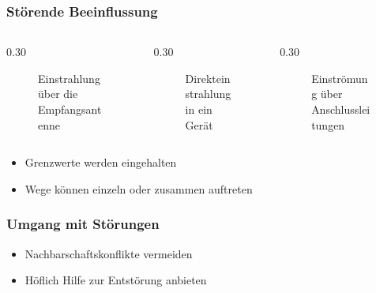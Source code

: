 \begin{frame}
    \frametitle{Störende Beeinflussung}
    \begin{columns}
        \begin{column}{0.30\textwidth}
            \begin{figure}
                \caption{\scriptsize Einstrahlung über die Empfangsantenne}
                \label{stoerungen_vermeiden_einstrahlung}
            \end{figure}
        \end{column}
        \begin{column}{0.30\textwidth}
            \begin{figure}
                \caption{\scriptsize Direkteinstrahlung in ein Gerät}
                \label{stoerungen_vermeiden_direkteinstrahlung}
            \end{figure}
        \end{column}
        \begin{column}{0.30\textwidth}

            \begin{figure}
                \caption{\scriptsize Einströmung über Anschlussleitungen}
                \label{stoerungen_vermeiden_einstroemung}
            \end{figure}
        \end{column}
    \end{columns}
    \begin{itemize}
        \item Grenzwerte werden eingehalten
        \item Wege können einzeln oder zusammen auftreten
    \end{itemize}
\end{frame}

\begin{frame}
    \frametitle{Umgang mit Störungen}
    \begin{itemize}
        \item Nachbarschaftskonflikte vermeiden
        \item Höflich Hilfe zur Entstörung anbieten
    \end{itemize}
\end{frame}

